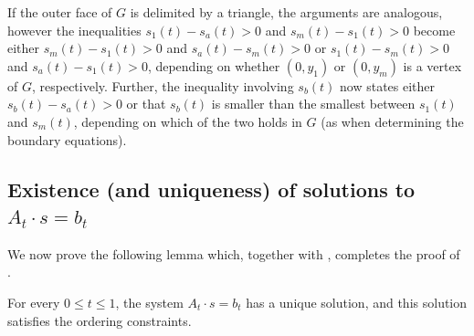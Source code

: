 If the outer face of $G$ is delimited by a triangle, the arguments are analogous, however the inequalities $s_1(t)-s_a(t)>0$ and $s_m(t)-s_1(t)>0$ become either $s_m(t)-s_1(t)>0$ and $s_a(t)-s_m(t)>0$ or $s_1(t)-s_m(t)>0$ and $s_a(t)-s_1(t)>0$, depending on whether $(0,y_1)$ or $(0,y_m)$ is a vertex of $G$, respectively. Further, the inequality involving $s_b(t)$ now states  either $s_b(t)-s_a(t)>0$ or that $s_b(t)$ is smaller than the smallest between $s_1(t)$ and $s_m(t)$, depending on which of the two holds in $G$ (as when determining the boundary equations).

\subsection{Existence (and uniqueness) of solutions to $A_t\cdot s=b_t$}

We now prove the following lemma which, together with , completes the proof of .

\begin{lem}
	For every $0\le t\le 1$, the system $A_t\cdot s=b_t$ has a unique solution,
	and this solution satisfies the ordering constraints. %
\end{lem}

